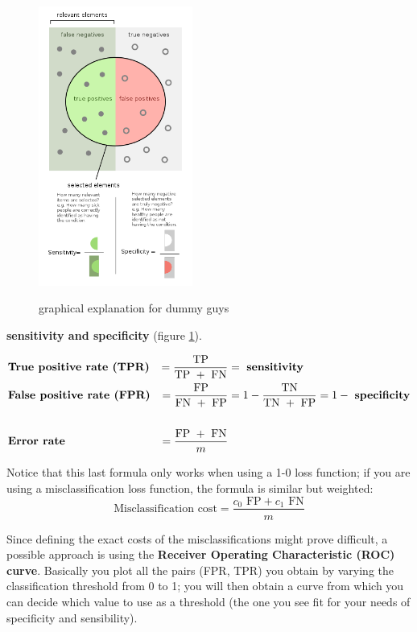     \begin{figure}[H]
      \caption{graphical explanation for dummy guys} %
      \centering
      \includegraphics[width=0.45\textwidth]{SensitivityandSpecificity}
      \label{sensitivSpecificity}
      \end{figure}

    \textbf{sensitivity and specificity} (figure \ref{sensitivSpecificity}).
     
    \begin{align*}
      &\text{\textbf{True positive rate (TPR)}} &= \frac{\text{TP}}{\text{TP } + \text{ FN}} 
      &= \text{ \textbf{sensitivity}}\\
      &\text{\textbf{False positive rate (FPR)}} 
      &= \frac{\text{FP}}{\text{FN } + \text{ FP}} 
      &= 1 - \frac{\text{TN}}{\text{TN } + \text{ FP}} = 1 - \text{ \textbf{specificity}} \\\\
      &\text{\textbf{Error rate}} &= \frac{\text{FP } + \text{ FN}}{m}
    \end{align*}

    
    Notice that this last formula only works when using a 1-0 loss function; if
    you are using a misclassification loss function, the formula is similar but
    weighted:
    $$\text{Misclassification cost}= \frac{c_0 \text{ FP} + c_1 \text{ FN}}{m}$$

    Since defining the exact costs of the misclassifications might prove
    difficult, a possible approach is using the \textbf{Receiver Operating
    Characteristic (ROC) curve}. Basically you plot all the pairs (FPR, TPR) you
    obtain by varying the classification threshold from 0 to 1; you will then
    obtain a curve from which you can decide which value to use as a threshold
    (the one you see fit for your needs of specificity and sensibility). 
   
